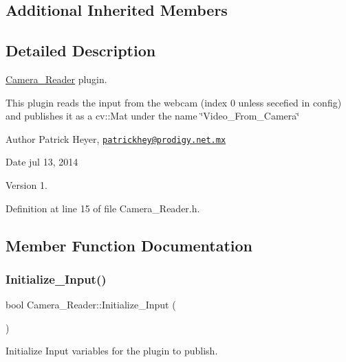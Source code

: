 \subsection*{Additional Inherited Members}


\subsection{Detailed Description}
\hyperlink{class_camera___reader}{Camera\+\_\+\+Reader} plugin. 

This plugin reads the input from the webcam (index 0 unless secefied in config) and publishes it as a cv\+::\+Mat under the name \char`\"{}\+Video\+\_\+\+From\+\_\+\+Camera\char`\"{}

\begin{DoxyAuthor}{Author}
Patrick Heyer, \href{mailto:patrickhey@prodigy.net.mx}{\tt patrickhey@prodigy.\+net.\+mx} 
\end{DoxyAuthor}
\begin{DoxyDate}{Date}
jul 13, 2014 
\end{DoxyDate}
\begin{DoxyVersion}{Version}
1. 
\end{DoxyVersion}


Definition at line 15 of file Camera\+\_\+\+Reader.\+h.



\subsection{Member Function Documentation}
\mbox{\label{class_camera___reader_aa4870916d311618a5b6513f12c3e125b}} 
\subsubsection{\texorpdfstring{Initialize\+\_\+\+Input()}{Initialize\_Input()}}
{\footnotesize\ttfamily bool Camera\+\_\+\+Reader\+::\+Initialize\+\_\+\+Input (\begin{DoxyParamCaption}{ }\end{DoxyParamCaption})\hspace{0.3cm}{\ttfamily [virtual]}}



Initialize Input variables for the plugin to publish. 

